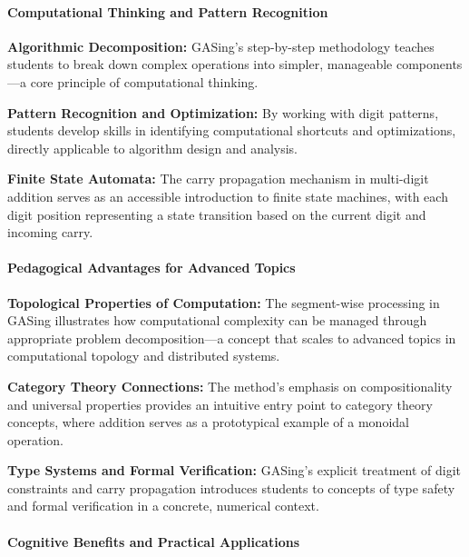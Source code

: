 \paragraph{Computational Thinking and Pattern Recognition}


\noindent\textbf{\textbf{Algorithmic Decomposition}:} GASing's step-by-step methodology teaches students to break down complex operations into simpler, manageable components—a core principle of computational thinking.



\noindent\textbf{\textbf{Pattern Recognition and Optimization}:} By working with digit patterns, students develop skills in identifying computational shortcuts and optimizations, directly applicable to algorithm design and analysis.



\noindent\textbf{\textbf{Finite State Automata}:} The carry propagation mechanism in multi-digit addition serves as an accessible introduction to finite state machines, with each digit position representing a state transition based on the current digit and incoming carry.

\paragraph{Pedagogical Advantages for Advanced Topics}


\noindent\textbf{\textbf{Topological Properties of Computation}:} The segment-wise processing in GASing illustrates how computational complexity can be managed through appropriate problem decomposition—a concept that scales to advanced topics in computational topology and distributed systems.



\noindent\textbf{\textbf{Category Theory Connections}:} The method's emphasis on compositionality and universal properties provides an intuitive entry point to category theory concepts, where addition serves as a prototypical example of a monoidal operation.



\noindent\textbf{\textbf{Type Systems and Formal Verification}:} GASing's explicit treatment of digit constraints and carry propagation introduces students to concepts of type safety and formal verification in a concrete, numerical context.

\paragraph{Cognitive Benefits and Practical Applications}


